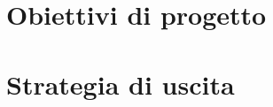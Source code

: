 \section{Obiettivi di progetto}\label{sec:whattheproblemis}

\section{Strategia di uscita}\label{sec:exitstrategy}

